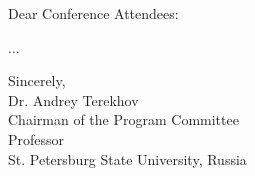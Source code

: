 \cleardoublepage
{}

Dear Conference Attendees:

...

\vspace{18pt}
Sincerely,\\
Dr. Andrey Terekhov\\
Chairman of the Program Committee \\
Professor\\
St. Petersburg State University, Russia
